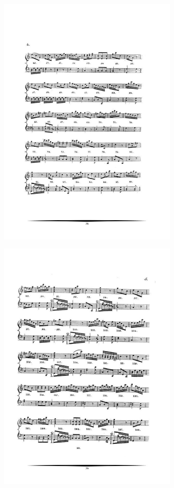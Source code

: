 \documentclass[a4paper, openright, 11pt, titlepage]{report}
\theoremstyle{definition}\newtheorem{defin}[propo]{Definition}
\theoremstyle{definition}\newtheorem{obser}[propo]{Remark}
\theoremstyle{definition}\newtheorem{ejem}[propo]{Ejemplo}
\theoremstyle{definition}\newtheorem{algoritmo}[propo]{Algoritmo}
\begin{document}
\begin{figure}[H]
    \centering
    \includegraphics[width = 0.8\textwidth]{Images/Apéndices/Apéndice E/mozart5.png}
\end{figure}
\begin{figure}[H]
    \centering
    \includegraphics[width = 0.8\textwidth]{Images/Apéndices/Apéndice E/mozart6.png}
\end{figure}
\end{document}
